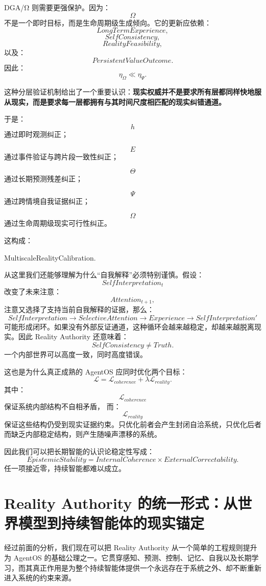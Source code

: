 DGA/Ω 则需要更强保护。因为：
\[
\Omega
\]
不是一个即时目标，而是生命周期级生成倾向。它的更新应依赖：
\[
LongTermExperience,
\]
\[
SelfConsistency,
\]
\[
RealityFeasibility,
\]
以及：
\[
PersistentValueOutcome.
\]
因此：
\[
\eta_\Omega
\ll
\eta_\Psi.
\]

这种分层验证机制给出了一个重要认识：\textbf{现实权威并不是要求所有层都同样快地服从现实，而是要求每一层都拥有与其时间尺度相匹配的现实纠错通道。}

于是：
\[
h
\]
通过即时观测纠正；

\[
E
\]
通过事件验证与跨片段一致性纠正；

\[
\Theta
\]
通过长期预测残差纠正；

\[
\Psi
\]
通过跨情境自我证据纠正；

\[
\Omega
\]
通过生命周期级现实可行性纠正。

这构成：
\begin{statementbox}
MultiscaleRealityCalibration.
\end{statementbox}

从这里我们还能够理解为什么``自我解释''必须特别谨慎。假设：
\[
SelfInterpretation_t
\]
改变了未来注意：
\[
Attention_{t+1},
\]
注意又选择了支持当前自我解释的证据，那么：
\[
SelfInterpretation
\rightarrow
SelectiveAttention
\rightarrow
Experience
\rightarrow
SelfInterpretation'
\]
可能形成闭环。如果没有外部反证通道，这种循环会越来越稳定，却越来越脱离现实。因此 Reality Authority 还意味着：
\[
\boxed{
SelfConsistency
\neq
Truth.
}
\]
一个内部世界可以高度一致，同时高度错误。

这也是为什么真正成熟的 AgentOS 应同时优化两个目标：
\[
\mathcal L
=
\mathcal L_{coherence}
+
\lambda
\mathcal L_{reality}.
\]
其中：
\[
\mathcal L_{coherence}
\]
保证系统内部结构不自相矛盾，
而：
\[
\mathcal L_{reality}
\]
保证这些结构仍受到现实证据约束。只优化前者会产生封闭自洽系统，只优化后者而缺乏内部稳定结构，则产生随噪声漂移的系统。

因此我们可以把长期智能的认识论稳定性写成：
\[
\boxed{
EpistemicStability
=
InternalCoherence
\times
ExternalCorrectability.
}
\]
任一项接近零，持续智能都难以成立。

\section{Reality Authority 的统一形式：从世界模型到持续智能体的现实锚定}

经过前面的分析，我们现在可以把 Reality Authority 从一个简单的工程规则提升为 AgentOS 的基础公理之一。它贯穿感知、预测、控制、记忆、自我以及长期学习，而其真正作用是为整个持续智能体提供一个永远存在于系统之外、却不断重新进入系统的约束来源。

